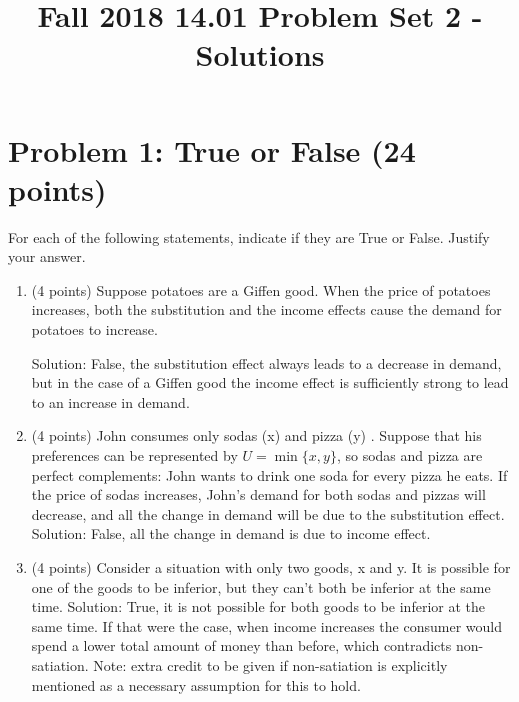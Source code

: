 \documentclass{article}
\begin{document}
\title{Fall 2018 14.01 Problem Set 2 - Solutions}
\maketitle

\section{Problem 1: True or False (24 points)}
For each of the following statements, indicate if they are True or False. Justify your answer.

\begin{enumerate}
\item(4 points) Suppose potatoes are a Giffen good. When the price of potatoes increases, both the substitution and the income effects cause the demand for potatoes to increase.

Solution: False, the substitution effect always leads to a decrease in demand, but in the case of a Giffen good the income effect is sufficiently strong to lead to an increase in demand.

\item(4 points) John consumes only sodas (x) and pizza (y) . Suppose that his preferences can be represented by $U = \min \{x, y\} $, so sodas and pizza are perfect complements: John wants to drink one soda for every pizza he eats. If the price of sodas increases, John's demand for both sodas and pizzas will decrease, and all the change in demand will be due to the substitution effect.
Solution: False, all the change in demand is due to income effect.
\item(4 points) Consider a situation with only two goods, x and y. It is possible for one of the goods to be inferior, but they can't both be inferior at the same time.
Solution: True, it is not possible for both goods to be inferior at the same time. If that were the case, when income increases the consumer would spend a lower total amount of money than before, which contradicts non-satiation. Note: extra credit to be given if non-satiation is explicitly mentioned as a necessary assumption for this to hold.
\end{enumerate}
\end{document}
